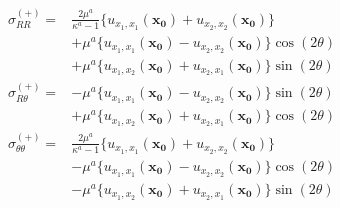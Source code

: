 \begin{align}
	\sigma_{RR}^{(+)}
	=&\frac{ 2\mu^{a}}{\kappa^{a}-1}
	\bigl\{u_{x_{1},x_{1}}(\bm{x_{0}})+u_{x_{2},x_{2}}(\bm{x_{0}})\bigr\}
	\nonumber
	\\
	&+\mu^{a}
	\bigl\{u_{x_{1},x_{1}}(\bm{x_{0}})-u_{x_{2},x_{2}}(\bm{x_{0}})\bigr\}\cos(2\theta)
	\nonumber
	\\
	&+\mu^{a}
	\bigl\{u_{x_{1},x_{2}}(\bm{x_{0}})+u_{x_{2},x_{1}}(\bm{x_{0}})\bigr\}\sin(2\theta)
	\label{eq:eRROutEpsSol}
\end{align}
\begin{align}
	\sigma_{R\theta}^{(+)}
	=&-\mu^{a}
	\bigl\{u_{x_{1},x_{1}}(\bm{x_{0}})-u_{x_{2},x_{2}}(\bm{x_{0}})\bigr\}\sin(2\theta)
	\nonumber
	\\
	&+\mu^{a}
	\bigl\{u_{x_{1},x_{2}}(\bm{x_{0}})+u_{x_{2},x_{1}}(\bm{x_{0}})\bigr\}\cos(2\theta)
	\label{eq:eRThOutEpsSol}
\end{align}
\begin{align}
	\sigma_{\theta\theta}^{(+)}
	=&\frac{ 2\mu^{a}}{\kappa^{a}-1}
	\bigl\{u_{x_{1},x_{1}}(\bm{x_{0}})+u_{x_{2},x_{2}}(\bm{x_{0}})\bigr\}
	\nonumber
	\\
	&-\mu^{a}
	\bigl\{u_{x_{1},x_{1}}(\bm{x_{0}})-u_{x_{2},x_{2}}(\bm{x_{0}})\bigr\}\cos(2\theta)
	\nonumber
	\\
	&-\mu^{a}
	\bigl\{u_{x_{1},x_{2}}(\bm{x_{0}})+u_{x_{2},x_{1}}(\bm{x_{0}})\bigr\}\sin(2\theta)
	\label{eq:eThThOutEpsSol}
\end{align}

